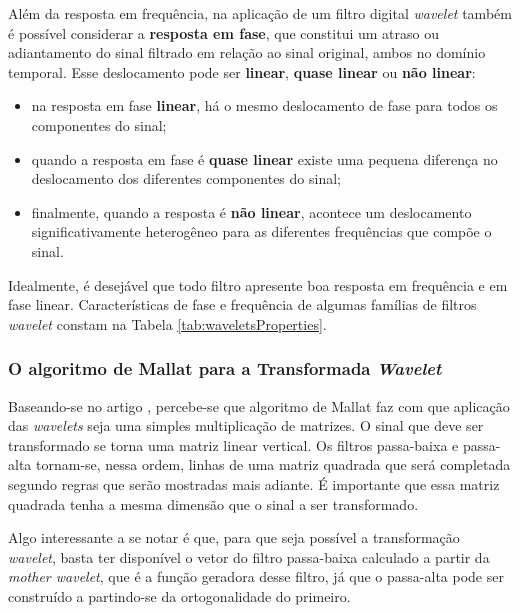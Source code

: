 			\par Além da resposta em frequência, na aplicação de um filtro digital \textit{wavelet} também é possível considerar a \textbf{resposta em fase}, que constitui um atraso ou adiantamento do sinal filtrado em relação ao sinal original, ambos no domínio temporal. Esse deslocamento pode ser \textbf{linear}, \textbf{quase linear} ou \textbf{não linear}: 
			
			\begin{itemize}
				\item na resposta em fase \textbf{linear}, há o mesmo deslocamento de fase para todos os componentes do sinal;
				\item quando a resposta em fase é \textbf{quase linear} existe uma pequena diferença no deslocamento dos diferentes componentes do sinal;
				\item finalmente, quando a resposta é \textbf{não linear}, acontece um deslocamento significativamente heterogêneo para as diferentes frequências que compõe o sinal.
				\end{itemize}
			
			\par Idealmente, é desejável que todo filtro apresente boa resposta em frequência e em fase linear. Características de fase e frequência de algumas famílias de filtros \textit{wavelet} constam na Tabela \ref{tab:waveletsProperties}.
			
			

		\subsubsection{O algoritmo de Mallat para a Transformada \textit{Wavelet}}
			\par Baseando-se no artigo \cite{7079589}, percebe-se que algoritmo de Mallat faz com que aplicação das \textit{wavelets} seja uma simples multiplicação de matrizes. O sinal que deve ser transformado se torna uma matriz linear vertical. Os filtros passa-baixa e passa-alta tornam-se, nessa ordem, linhas de uma matriz quadrada que será completada segundo regras que serão mostradas mais adiante. É importante que essa matriz quadrada tenha a mesma dimensão que o sinal a ser transformado.
		
			\par Algo interessante a se notar é que, para que seja possível a transformação \textit{wavelet}, basta ter disponível o vetor do filtro passa-baixa calculado a partir da \textit{mother wavelet}, que é a função geradora desse filtro, já que o passa-alta pode ser construído a partindo-se da ortogonalidade do primeiro.
			
